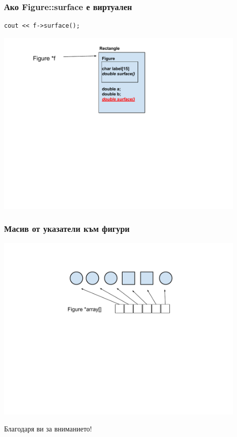 \documentclass{beamer}
\begin{document}
\begin{frame}[fragile]
\frametitle{Ако Figure::surface е виртуален}


\begin{flushleft}
\begin{lstlisting}
cout << f->surface();
\end{lstlisting}  
\end{flushleft}

\begin{center}
\includegraphics[width=12.0cm]{images/inmen_rect_withptr_r2}
\end{center}


\end{frame}


\begin{frame}[fragile]
\frametitle{Масив от указатели към фигури}

\begin{center}
\includegraphics[width=12.0cm]{images/array}
\end{center}


\end{frame}


\begin{frame}
\centerline{Благодаря ви за вниманието!}
\end{frame}
\end{document}
